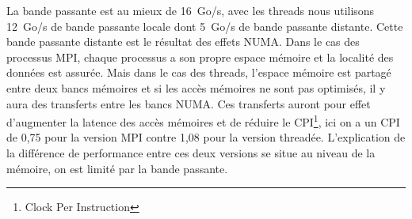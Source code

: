 La bande passante est au mieux de 16~Go/s, avec les threads nous utilisons 12~Go/s de bande passante locale dont 5~Go/s de bande passante distante.
%
Cette bande passante distante est le résultat des effets NUMA.
%
Dans le cas des processus MPI, chaque processus a son propre espace mémoire et la localité des données est assurée.
%
Mais dans le cas des threads, l'espace mémoire est partagé entre deux bancs mémoires et si les accès mémoires ne sont pas optimisés, il y aura des transferts entre les bancs NUMA.
%
Ces transferts auront pour effet d'augmenter la latence des accès mémoires et de réduire le CPI\footnote{Clock Per Instruction}, ici on a un CPI de 0,75 pour la version MPI contre 1,08 pour la version threadée.
%
L'explication de la différence de performance entre ces deux versions se situe au niveau de la mémoire, on est limité par la bande passante.






